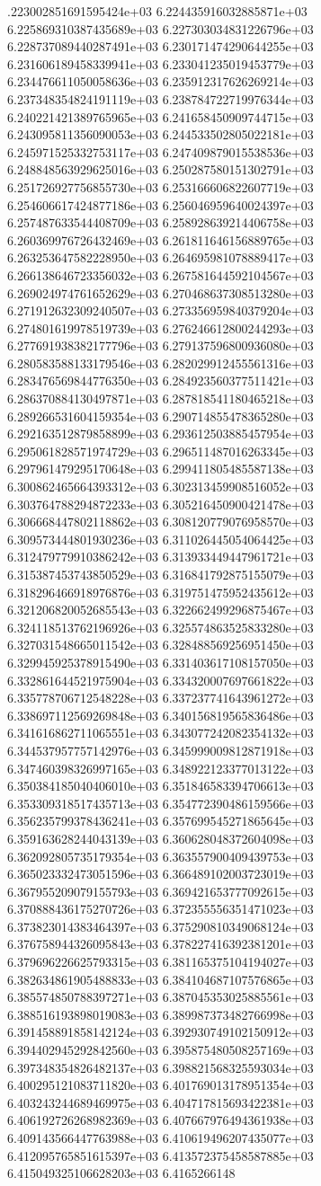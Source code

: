 .223002851691595424e+03	6.224435916032885871e+03	6.225869310387435689e+03	6.227303034831226796e+03	6.228737089440287491e+03	6.230171474290644255e+03	6.231606189458339941e+03	6.233041235019453779e+03	6.234476611050058636e+03	6.235912317626269214e+03	6.237348354824191119e+03	6.238784722719976344e+03	6.240221421389765965e+03	6.241658450909744715e+03	6.243095811356090053e+03	6.244533502805022181e+03	6.245971525332753117e+03	6.247409879015538536e+03	6.248848563929625016e+03	6.250287580151302791e+03	6.251726927756855730e+03	6.253166606822607719e+03	6.254606617424877186e+03	6.256046959640024397e+03	6.257487633544408709e+03	6.258928639214406758e+03	6.260369976726432469e+03	6.261811646156889765e+03	6.263253647582228950e+03	6.264695981078889417e+03	6.266138646723356032e+03	6.267581644592104567e+03	6.269024974761652629e+03	6.270468637308513280e+03	6.271912632309240507e+03	6.273356959840379204e+03	6.274801619978519739e+03	6.276246612800244293e+03	6.277691938382177796e+03	6.279137596800936080e+03	6.280583588133179546e+03	6.282029912455561316e+03	6.283476569844776350e+03	6.284923560377511421e+03	6.286370884130497871e+03	6.287818541180465218e+03	6.289266531604159354e+03	6.290714855478365280e+03	6.292163512879858899e+03	6.293612503885457954e+03	6.295061828571974729e+03	6.296511487016263345e+03	6.297961479295170648e+03	6.299411805485587138e+03	6.300862465664393312e+03	6.302313459908516052e+03	6.303764788294872233e+03	6.305216450900421478e+03	6.306668447802118862e+03	6.308120779076958570e+03	6.309573444801930236e+03	6.311026445054064425e+03	6.312479779910386242e+03	6.313933449447961721e+03	6.315387453743850529e+03	6.316841792875155079e+03	6.318296466918976876e+03	6.319751475952435612e+03	6.321206820052685543e+03	6.322662499296875467e+03	6.324118513762196926e+03	6.325574863525833280e+03	6.327031548665011542e+03	6.328488569256951450e+03	6.329945925378915490e+03	6.331403617108157050e+03	6.332861644521975904e+03	6.334320007697661822e+03	6.335778706712548228e+03	6.337237741643961272e+03	6.338697112569269848e+03	6.340156819565836486e+03	6.341616862711065551e+03	6.343077242082354132e+03	6.344537957757142976e+03	6.345999009812871918e+03	6.347460398326997165e+03	6.348922123377013122e+03	6.350384185040406010e+03	6.351846583394706613e+03	6.353309318517435713e+03	6.354772390486159566e+03	6.356235799378436241e+03	6.357699545271865645e+03	6.359163628244043139e+03	6.360628048372604098e+03	6.362092805735179354e+03	6.363557900409439753e+03	6.365023332473051596e+03	6.366489102003723019e+03	6.367955209079155793e+03	6.369421653777092615e+03	6.370888436175270726e+03	6.372355556351471023e+03	6.373823014383464397e+03	6.375290810349068124e+03	6.376758944326095843e+03	6.378227416392381201e+03	6.379696226625793315e+03	6.381165375104194027e+03	6.382634861905488833e+03	6.384104687107576865e+03	6.385574850788397271e+03	6.387045353025885561e+03	6.388516193898019083e+03	6.389987373482766998e+03	6.391458891858142124e+03	6.392930749102150912e+03	6.394402945292842560e+03	6.395875480508257169e+03	6.397348354826482137e+03	6.398821568325593034e+03	6.400295121083711820e+03	6.401769013178951354e+03	6.403243244689469975e+03	6.404717815693422381e+03	6.406192726268982369e+03	6.407667976494361938e+03	6.409143566447763988e+03	6.410619496207435077e+03	6.412095765851615397e+03	6.413572375458587885e+03	6.415049325106628203e+03	6.4165266148